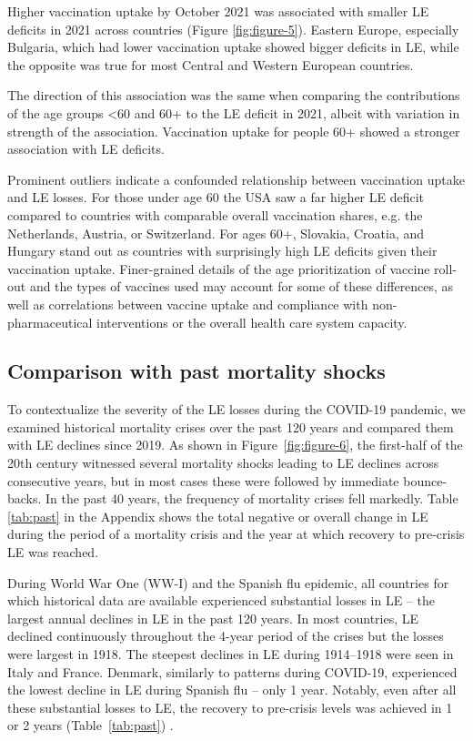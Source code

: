 \documentclass[12pt]{article}
\begin{document}
Higher vaccination uptake by October 2021 was associated with smaller LE deficits in 2021 across countries (Figure \ref{fig:figure-5}). Eastern Europe, especially Bulgaria, which had lower vaccination uptake showed bigger deficits in LE, while the opposite was true for most Central and Western European countries.

The direction of this association was the same when comparing the contributions of the age groups <60 and 60+ to the LE deficit in 2021, albeit with variation in strength of the association. Vaccination uptake for people 60+ showed a stronger association with LE deficits.

Prominent outliers indicate a confounded relationship between vaccination uptake and LE losses. For those under age 60 the USA saw a far higher LE deficit compared to countries with comparable overall vaccination shares, e.g. the Netherlands, Austria, or Switzerland. For ages 60+, Slovakia, Croatia, and Hungary stand out as countries with surprisingly high LE deficits given their vaccination uptake. Finer-grained details of the age prioritization of vaccine roll-out and the types of vaccines used may account for some of these differences, as well as correlations between vaccine uptake and compliance with non-pharmaceutical interventions or the overall health care system capacity.

\subsection*{Comparison with past mortality shocks}

To contextualize the severity of the LE losses during the COVID-19 pandemic, we examined historical mortality crises over the past 120 years and compared them with LE declines since 2019. As shown in Figure~\ref{fig:figure-6}, the first-half of the 20th century witnessed several mortality shocks leading to LE declines across consecutive years, but in most cases these were followed by immediate bounce-backs. In the past 40 years, the frequency of mortality crises fell markedly. Table \ref{tab:past} in the Appendix shows the total negative or overall change in LE during the period of a mortality crisis and the year at which recovery to pre-crisis LE was reached.

During World War One (WW-I) and the Spanish flu epidemic, all countries for which historical data are available experienced substantial losses in LE -- the largest annual declines in LE in the past 120 years. In most countries, LE declined continuously throughout the 4-year period of the crises but the losses were largest in 1918. The steepest declines in LE during 1914--1918 were seen in Italy and France. Denmark, similarly to patterns during COVID-19, experienced the lowest decline in LE during Spanish flu -- only 1 year. Notably, even after all these substantial losses to LE, the recovery to pre-crisis levels was achieved in 1 or 2 years (Table~\ref{tab:past}) .
\end{document}
